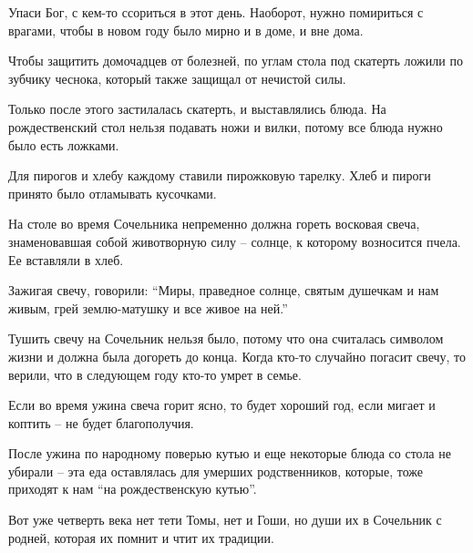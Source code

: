 Упаси Бог, с кем-то ссориться в этот день. Наоборот, нужно помириться с
врагами, чтобы в новом году было мирно и в доме, и вне дома. 

Чтобы защитить домочадцев от болезней, по углам стола под скатерть ложили по
зубчику чеснока, который также защищал от нечистой силы. 

Только после этого застилалась скатерть, и выставлялись блюда. На
рождественский стол нельзя подавать ножи и вилки, потому все блюда нужно было
есть ложками.

Для пирогов и хлебу каждому ставили пирожковую тарелку. Хлеб и пироги принято
было отламывать кусочками.

На столе во время Сочельника непременно должна гореть восковая свеча,
знаменовавшая собой животворную силу – солнце, к которому возносится пчела. Ее
вставляли в хлеб.

Зажигая свечу, говорили: \enquote{Миры, праведное солнце, святым душечкам и нам живым,
грей землю-матушку и все живое на ней.}

Тушить свечу на Сочельник нельзя было, потому что она считалась символом жизни
и должна была догореть до конца. Когда кто-то случайно погасит свечу, то
верили, что в следующем году кто-то умрет в семье. 

Если во время ужина свеча горит ясно, то будет хороший год, если мигает и
коптить – не будет благополучия.

После ужина по народному поверью кутью и еще некоторые блюда со стола не
убирали – эта еда оставлялась для умерших родственников, которые, тоже приходят
к нам \enquote{на рождественскую кутью}. 

Вот уже четверть века нет тети Томы, нет и Гоши, но души их в Сочельник с
родней, которая их помнит и чтит их традиции.
